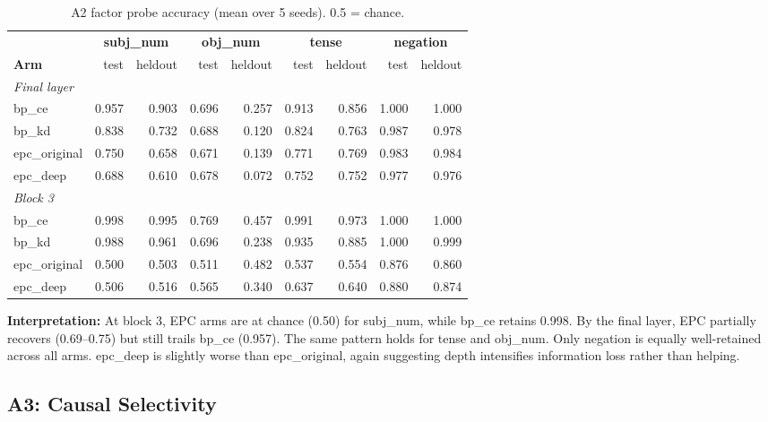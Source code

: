 \documentclass[11pt,a4paper]{article}
\begin{document}
\begin{table}[h]
\centering
\begin{tabular}{lrrrrrrrr}
\toprule
& \multicolumn{2}{c}{\textbf{subj\_num}} & \multicolumn{2}{c}{\textbf{obj\_num}} & \multicolumn{2}{c}{\textbf{tense}} & \multicolumn{2}{c}{\textbf{negation}} \\
\cmidrule(lr){2-3}\cmidrule(lr){4-5}\cmidrule(lr){6-7}\cmidrule(lr){8-9}
\textbf{Arm} & test & heldout & test & heldout & test & heldout & test & heldout \\
\midrule
\multicolumn{9}{l}{\textit{Final layer}} \\
\midrule
bp\_ce & 0.957 & 0.903 & 0.696 & 0.257 & 0.913 & 0.856 & 1.000 & 1.000 \\
bp\_kd & 0.838 & 0.732 & 0.688 & 0.120 & 0.824 & 0.763 & 0.987 & 0.978 \\
epc\_original & 0.750 & 0.658 & 0.671 & 0.139 & 0.771 & 0.769 & 0.983 & 0.984 \\
epc\_deep & 0.688 & 0.610 & 0.678 & 0.072 & 0.752 & 0.752 & 0.977 & 0.976 \\
\midrule
\multicolumn{9}{l}{\textit{Block 3}} \\
\midrule
bp\_ce & 0.998 & 0.995 & 0.769 & 0.457 & 0.991 & 0.973 & 1.000 & 1.000 \\
bp\_kd & 0.988 & 0.961 & 0.696 & 0.238 & 0.935 & 0.885 & 1.000 & 0.999 \\
epc\_original & 0.500 & 0.503 & 0.511 & 0.482 & 0.537 & 0.554 & 0.876 & 0.860 \\
epc\_deep & 0.506 & 0.516 & 0.565 & 0.340 & 0.637 & 0.640 & 0.880 & 0.874 \\
\bottomrule
\end{tabular}
\caption{A2 factor probe accuracy (mean over 5 seeds).  0.5 = chance.}
\label{tab:a2-factors}
\end{table}

\textbf{Interpretation:}
At block 3, EPC arms are at chance (0.50) for subj\_num, while bp\_ce
retains 0.998.  By the final layer, EPC partially recovers (0.69--0.75)
but still trails bp\_ce (0.957).  The same pattern holds for tense and
obj\_num.  Only negation is equally well-retained across all arms.
epc\_deep is slightly worse than epc\_original, again suggesting depth
intensifies information loss rather than helping.

\subsection{A3: Causal Selectivity}
\end{document}
